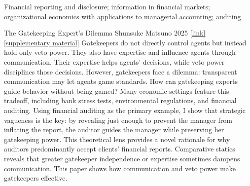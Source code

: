 \newcommand{\co}{\textsuperscript{†}}




\begin{cventries}

\cventryLONG
	{Financial reporting and disclosure; information in financial markets; organizational economics with applications to managerial accounting; auditing}  

\end{cventries}

\vspace{.3cm}


\paperentry
	{The Gatekeeping Expert's Dilemma}   %
	{Shunsuke Matsuno}   %
	{2025}   %
	{\href{https://papers.ssrn.com/sol3/papers.cfm?abstract_id=5583773}{[link]} \href{https://shunsukematsuno.github.io/papers/supplementary-material_Gatekeeping-Experts-Dilemma.pdf}{[supplementary material]}}  %
	{}   %
	{}   %
	{}   %
	{%
	Gatekeepers do not directly control agents but instead hold only veto power. They also have expertise and influence agents through communication. Their expertise helps agents' decisions, while veto power disciplines those decisions. However, gatekeepers face a dilemma: transparent communication may let agents game standards. How can gatekeeping experts guide behavior without being gamed? Many economic settings feature this tradeoff, including bank stress tests, environmental regulations, and financial auditing. Using financial auditing as the primary example, I show that strategic vagueness is the key: by revealing just enough to prevent the manager from inflating the report, the auditor guides the manager while preserving her gatekeeping power. This theoretical lens provides a novel rationale for why auditors predominantly accept clients' financial reports. Comparative statics reveals that greater gatekeeper independence or expertise sometimes dampens communication. This paper shows how communication and veto power make gatekeepers effective.
	}

